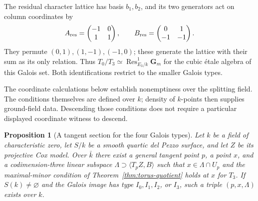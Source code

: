 \documentclass[11pt]{article}
\newtheorem{proposition}[theorem]{Proposition}
\theoremstyle{remark}
\newcommand{\Gm}{\mathbf G_m}
\begin{document}
The residual character lattice has basis \(b_1,b_2\), and its two
generators act on column coordinates by
\[
 A_{\rm res}=\begin{pmatrix}-1&0\\1&1\end{pmatrix},\qquad
 B_{\rm res}=\begin{pmatrix}0&1\\-1&-1\end{pmatrix}.
\]
They permute \((0,1),(1,-1),(-1,0)\); these generate the lattice with their
sum as its only relation.  Thus
\(T_0/T_3\simeq\operatorname{Res}^{1}_{E_3/k}\Gm\)
for the cubic \'etale algebra of this Galois set.  Both identifications
restrict to the smaller Galois types.

The coordinate calculations below establish nonemptiness over the splitting
field.  The conditions themselves are defined over \(k\); density of
\(k\)-points then supplies ground-field data.  Descending those conditions
does not require a particular displayed coordinate witness to descend.

\begin{proposition}[A tangent section for the four Galois types]
\label{prop:tangent-section}
%
%
%
%
Let \(k\) be a field of characteristic zero, let \(S/k\) be a smooth quartic
del Pezzo surface, and let \(Z\) be its projective Cox model.  Over \(\bar k\)
there exist a general tangent point \(p\), a point \(x\), and a
codimension-three linear subspace
\(\Lambda\supset\langle T_pZ,B\rangle\) such that
\(x\in\Lambda\cap U_p\) and the maximal-minor condition of
Theorem~\ref{thm:torus-quotient} holds at \(x\) for \(T_3\).  If
\(S(k)\ne\varnothing\) and the Galois image has type \(I_0,I_1,I_2\), or
\(I_3\), such a triple \((p,x,\Lambda)\) exists over \(k\).
\end{proposition}
\end{document}
